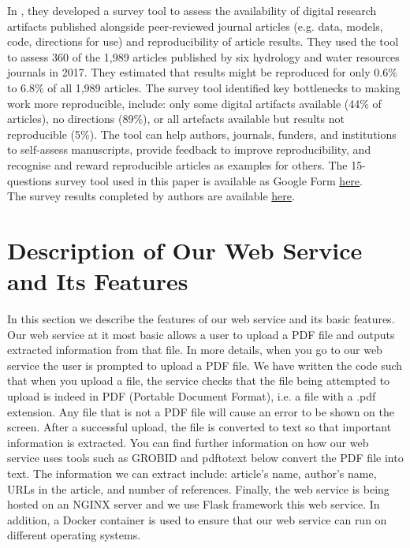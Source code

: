 \documentclass[
10pt, %
a4paper, %
oneside, %
headinclude,footinclude, %
BCOR5mm, %
]{scrartcl}
\begin{document}
In \cite{Stagge2019Assessing}, they developed a survey tool to assess the availability of digital research artifacts published alongside peer-reviewed journal articles (e.g. data, models, code, directions for use) and reproducibility of article results.
They used the tool to assess 360 of the 1,989 articles published by six hydrology and water resources journals in 2017.
They estimated that results might be reproduced for only 0.6\% to 6.8\% of all 1,989 articles.
The survey tool identified key bottlenecks to making work more reproducible, include: only some digital artifacts available (44\% of articles), no directions (89\%), or all artefacts available but results not reproducible (5\%).
The tool can help authors, journals, funders, and institutions to self-assess manuscripts, provide feedback to improve reproducibility, and recognise and reward reproducible articles as examples for others.
The 15-questions survey tool used in this paper is available as Google Form
\href{https://docs.google.com/forms/d/e/1FAIpQLSdWvcUUjUT6k2sBRe9pIBca_BPUdE8kMmyUGvCZkWmnq-UDvQ/viewform}{here}.\\
The survey results completed by authors are available
\href{https://www.dropbox.com/home/\%5BGroup\%201\%5DScientific\%20Information\%20Share/literature_review_Group/Literature\%20review\%20on\%20assessments\%20of\%20reproducibility/Reproducibility\%20data?preview=Paper+2+result.xlsx}{here}.

\section{Description of Our Web Service and Its Features}

In this section we describe the features of our web service and its basic features. Our web service at it most basic allows a user to upload a PDF file and outputs extracted information from that file. In more details, when you go to our web service the user is prompted 
to upload a PDF file. We have written the code such that when you upload a file, the service checks that the file being attempted to upload is indeed in PDF (Portable Document Format), i.e. a file with a .pdf extension. Any file that is not a PDF file will cause an error to be shown on the screen. 
After a successful upload, the file is converted to text so that important information is extracted. You can find further information on how our web service uses tools such as GROBID and pdftotext below convert the PDF file into text. 
The information we can extract include: article's name, author's name, URLs in the article, and number of references. Finally, the web service is being hosted on an NGINX server and we use Flask framework this web service. In addition, a Docker container is used to ensure that our web service can run on different operating systems. 
\end{document}
